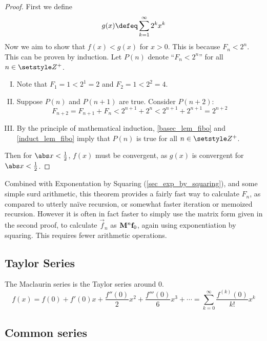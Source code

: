 \begin{proof}
 First we define
 \begin{equation*}
  g(x) \defeq \sum_{k=1}^\infty 2^k x^k
 \end{equation*}
 Now we aim to show that \(f(x) < g(x)\) for \(x > 0\). This is because
 \(F_n < 2^n\). This can be proven by induction. Let \(P(n)\) denote
 ``\(F_n < 2^n\)'' for all \(n \in \Integers^+\).
 \begin{enumerate}[I.]
  \item \label{basec_lem_fibo}
        Note that \(F_1 = 1 < 2^1 = 2\) and \(F_2 = 1 < 2^2 = 4\).
  \item \label{induct_lem_fibo}
        Suppose \(P(n)\) and \(P(n + 1)\) are true. Consider \(P(n + 2)\):
        \begin{equation*}
        F_{n + 2} = F_{n + 1} + F_n < 2^{n + 1} + 2^n < 2^{n + 1} + 2^{n + 1}
            = 2^{n + 2}
        \end{equation*}
  \item By the principle of mathematical induction, \ref{basec_lem_fibo} and
        \ref{induct_lem_fibo} imply that \(P(n)\) is true for all
        \(n \in \Integers^+\).
 \end{enumerate}
 Then for \(\abs x < \frac 12\), \(f(x)\)  must be convergent, as \(g(x)\) is
 convergent for \(\abs x < \frac 12\).
\end{proof}
Combined with Exponentation by Squaring (\ref{sec_exp_by_squaring}), and some
simple surd arithmetic, this theorem provides a fairly fast way to calculate
\(F_n\), as compared to utterly na\"ive recursion, or somewhat faster iteration
or memoized recursion. However it is often in fact faster to simply use the
matrix form given in the second proof, to calculate \(\vec f_n\) as \(\mathbf{M}^n\mathrm{\mathbf{f}}_0\), again using exponentiation by squaring. This requires fewer
arithmetic operations.

\subsection{Taylor Series}

The Maclaurin series is the Taylor series around \(0\).
\begin{equation}
f(x) = f(0) + f'(0) x + \frac{f''(0)} 2 x^2 + \frac{f'''(0)}6 x^3 +\dotsb
  = \sum_{k=0}^\infty \frac{f^{(k)}(0)}{k!}x^k
\end{equation}

\subsection{Common series}
